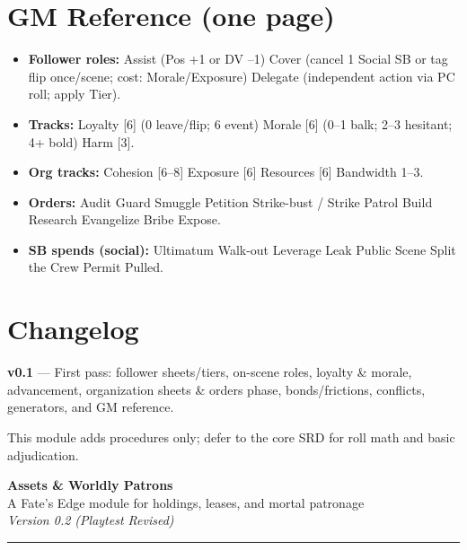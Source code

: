 \section*{GM Reference (one page)}
\begin{itemize}
  \item \textbf{Follower roles:} Assist (Pos +1 or DV --1) \textbullet{} Cover (cancel 1 Social SB or tag flip once/scene; cost: Morale/Exposure) \textbullet{} Delegate (independent action via PC roll; apply Tier).
  \item \textbf{Tracks:} Loyalty [6] (0 leave/flip; 6 event) \textbullet{} Morale [6] (0--1 balk; 2--3 hesitant; 4+ bold) \textbullet{} Harm [3].
  \item \textbf{Org tracks:} Cohesion [6--8] \textbullet{} Exposure [6] \textbullet{} Resources [6] \textbullet{} Bandwidth 1--3.
  \item \textbf{Orders:} Audit \textbullet{} Guard \textbullet{} Smuggle \textbullet{} Petition \textbullet{} Strike-bust / Strike \textbullet{} Patrol \textbullet{} Build \textbullet{} Research \textbullet{} Evangelize \textbullet{} Bribe \textbullet{} Expose.
  \item \textbf{SB spends (social):} Ultimatum \textbullet{} Walk-out \textbullet{} Leverage Leak \textbullet{} Public Scene \textbullet{} Split the Crew \textbullet{} Permit Pulled.
\end{itemize}

\vfill
\section*{Changelog}
\textbf{v0.1} --- First pass: follower sheets/tiers, on-scene roles, loyalty \& morale, advancement, organization sheets \& orders phase, bonds/frictions, conflicts, generators, and GM reference.

\begin{center}\small This module adds procedures only; defer to the core SRD for roll math and basic adjudication.\end{center}

\clearpage

\begin{center}
  {\LARGE \textbf{Assets \& Worldly Patrons}}\\[3pt]
  {\large A Fate's Edge module for holdings, leases, and mortal patronage}\\[2pt]
  \textit{Version 0.2 (Playtest Revised)}
  \end{center}
  \vspace{0.25em}
  \hrule\vspace{0.75em}
  
